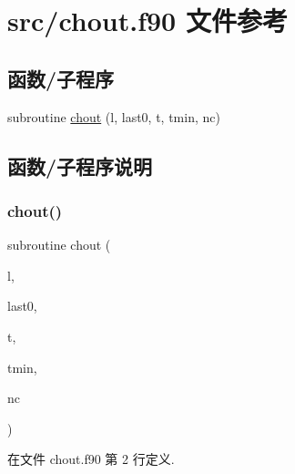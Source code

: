 \hypertarget{chout_8f90}{}\section{src/chout.f90 文件参考}
\label{chout_8f90}
\subsection*{函数/子程序}
\begin{DoxyCompactItemize}
\item 
subroutine \mbox{\hyperlink{chout_8f90_a3a85681027db781e21cd478154fb62ff}{chout}} (l, last0, t, tmin, nc)
\end{DoxyCompactItemize}


\subsection{函数/子程序说明}
\mbox{\label{chout_8f90_a3a85681027db781e21cd478154fb62ff}} 
\subsubsection{\texorpdfstring{chout()}{chout()}}
{\footnotesize\ttfamily subroutine chout (\begin{DoxyParamCaption}\item[{}]{l,  }\item[{}]{last0,  }\item[{}]{t,  }\item[{}]{tmin,  }\item[{}]{nc }\end{DoxyParamCaption})}



在文件 chout.\+f90 第 2 行定义.

